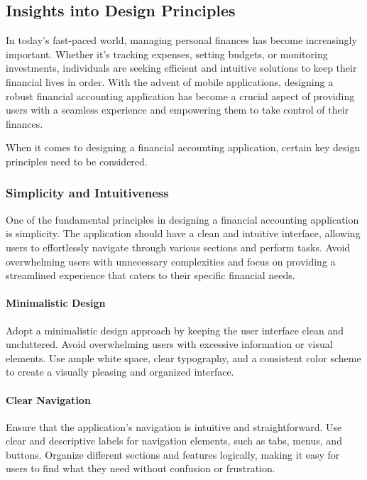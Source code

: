 
\subsection{Insights into Design Principles}

In today's fast-paced world, managing personal finances has become increasingly important. Whether it's tracking 
expenses, setting budgets, or monitoring investments, individuals are seeking efficient and intuitive solutions to 
keep their financial lives in order. With the advent of mobile applications, designing a robust financial accounting 
application has become a crucial aspect of providing users with a seamless experience and empowering them to take 
control of their finances.

When it comes to designing a financial accounting application, certain key design principles need to be considered. 

\subsubsection{Simplicity and Intuitiveness}
One of the fundamental principles in designing a financial accounting application is simplicity. The application 
should have a clean and intuitive interface, allowing users to effortlessly navigate through various sections and 
perform tasks. Avoid overwhelming users with unnecessary complexities and focus on providing a streamlined experience 
that caters to their specific financial needs.

\paragraph{Minimalistic Design}
Adopt a minimalistic design approach by keeping the user interface clean and uncluttered. 
Avoid overwhelming users with excessive information or visual elements. Use ample white space, clear typography, 
and a consistent color scheme to create a visually pleasing and organized interface.

\paragraph{Clear Navigation}
Ensure that the application's navigation is intuitive and straightforward. Use clear and 
descriptive labels for navigation elements, such as tabs, menus, and buttons. Organize different sections and 
features logically, making it easy for users to find what they need without confusion or frustration.

